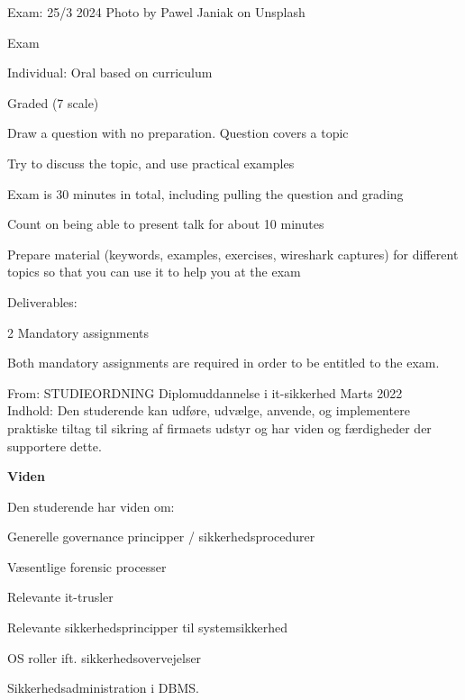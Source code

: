 \documentclass[Screen16to9,17pt]{foils}
\begin{document}
Exam: 25/3 2024 \hskip 12cm Photo by Pawel Janiak on Unsplash


\begin{list2}
\item Exam
\item Individual: Oral based on curriculum
\item Graded (7 scale)
\item Draw a question with no preparation. Question covers a topic
\item Try to discuss the topic, and use practical examples
\item Exam is 30 minutes in total, including pulling the question and grading
\item Count on being able to present talk for about 10 minutes
\item Prepare material (keywords, examples, exercises, wireshark captures) for different topics so that you can use it to help you at the exam

\vskip 5mm
\item Deliverables:
\item 2 Mandatory assignments
\item Both mandatory assignments are required in order to be entitled to the exam.
\end{list2}



From: STUDIEORDNING Diplomuddannelse i it-sikkerhed Marts 2022\\
Indhold: Den studerende kan udføre, udvælge, anvende, og implementere praktiske
tiltag til sikring af firmaets udstyr og har viden og færdigheder der supportere dette.

{\bf Viden}

Den studerende har viden om:
\begin{list2}
\item Generelle governance principper / sikkerhedsprocedurer
\item Væsentlige forensic processer
\item Relevante it-trusler
\item Relevante sikkerhedsprincipper til systemsikkerhed
\item OS roller ift. sikkerhedsovervejelser
\item Sikkerhedsadministration i DBMS.
\end{list2}

\end{document}
